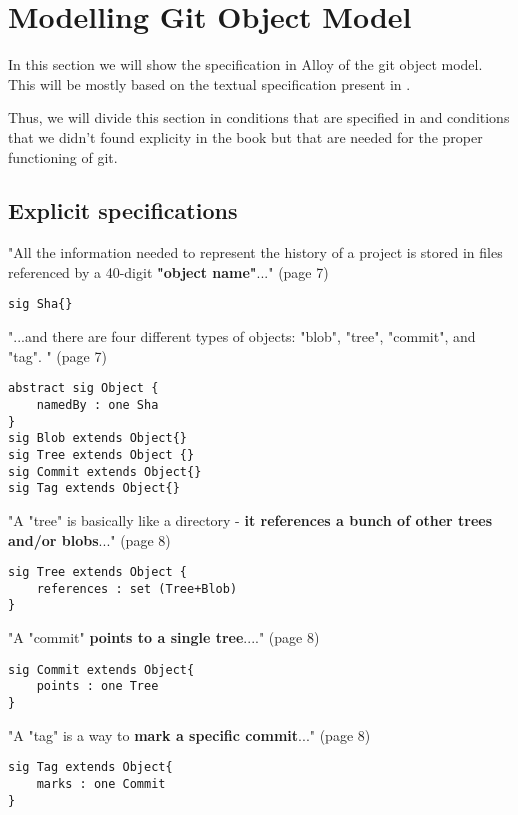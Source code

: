 \section{Modelling Git Object Model}

In this section we will show the specification in Alloy of the
git object model. This will be mostly based on the textual
specification present in \cite{gitComm}. \par
Thus, we will divide this section in conditions that are specified 
in \cite{gitComm} and conditions that we didn't found explicity
in the book but that are needed for the proper functioning of
git.

\subsection{Explicit specifications}

"All the information needed to represent the history
of a project is stored in files referenced by a 
40-digit {\bf "object name"}..." (page 7)

\begin{lstlisting}
sig Sha{}
\end{lstlisting}

"...and there are four different types of objects: "blob",
"tree", "commit", and "tag". " (page 7)

\begin{lstlisting}
abstract sig Object {
	namedBy : one Sha
}
sig Blob extends Object{}
sig Tree extends Object {}
sig Commit extends Object{}
sig Tag extends Object{}
\end{lstlisting}

"A "tree" is basically like a directory - {\bf it references a bunch
of other trees and/or blobs}..." (page 8)

\begin{lstlisting}
sig Tree extends Object {
	references : set (Tree+Blob)
}
\end{lstlisting}

"A "commit" {\bf points to a single tree}...." (page 8)

\begin{lstlisting}
sig Commit extends Object{
	points : one Tree
}
\end{lstlisting}

"A "tag" is a way to { \bf mark a specific commit}..." (page 8)

\begin{lstlisting}
sig Tag extends Object{
	marks : one Commit
}
\end{lstlisting}

